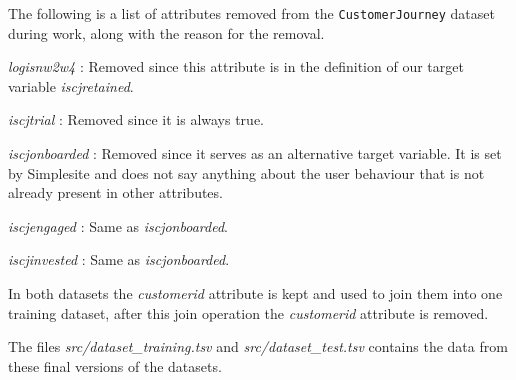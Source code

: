 \noindent The following is a list of attributes removed from the
\texttt{CustomerJourney} dataset during work, along with the reason for the
removal.

\begin{itemize*}

    \item \textit{logisnw2w4} : Removed since this attribute is in the definition
          of our target variable \textit{iscjretained}.

    \item \textit{iscjtrial} : Removed since it is always true.

    \item \textit{iscjonboarded} : Removed since it serves as an alternative
          target variable. It is set by Simplesite and does not say anything
          about the user behaviour that is not already present in other
          attributes.

    \item \textit{iscjengaged} : Same as \textit{iscjonboarded}.

    \item \textit{iscjinvested} : Same as \textit{iscjonboarded}.
\end{itemize*}

In both datasets the \textit{customerid} attribute is kept and used to join them
into one training dataset, after this join operation the \textit{customerid}
attribute is removed.

The files \textit{src/dataset\_training.tsv} and \textit{src/dataset\_test.tsv}
contains the data from these final versions of the datasets.
